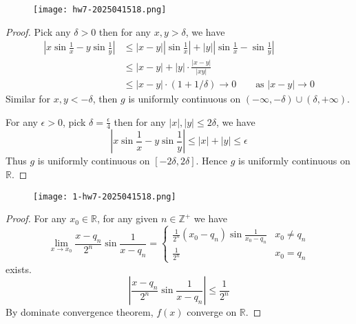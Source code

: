 \begin{exercise}
\begin{figure}[H]
\centering
\texttt{[image: hw7-2025041518.png]}
\label{}
\end{figure}
\end{exercise}
\begin{proof}
Pick any $\delta>0$ then for any $x,y>\delta$, we have
\[
\begin{aligned}
\left\lvert  x\sin\frac{1}{x}-y\sin\frac{1}{y}  \right\rvert  & \leq \lvert x-y \rvert \left\lvert  \sin\frac{1}{x}  \right\rvert +\lvert y \rvert \left\lvert  \sin\frac{1}{x}-\sin\frac{1}{y}  \right\rvert  \\
 & \leq \lvert x-y \rvert +\lvert y \rvert \cdot\frac{\lvert x-y \rvert }{\lvert xy \rvert } \\
 & \leq \lvert x-y \rvert \cdot (1+1/\delta) \to0\qquad \text{as }\lvert x-y \rvert \to0
\end{aligned}
\]
Similar for $x,y<-\delta$, then $g$ is uniformly continuous on $(-\infty,-\delta)\cup(\delta,+\infty)$.

For any $\epsilon>0$, pick $\delta=\frac{\epsilon}{4}$ then for any $\lvert x \rvert,\lvert y \rvert\leq2\delta$, we have
\[
\left\lvert  x\sin\frac{1}{x}-y\sin\frac{1}{y}  \right\rvert \leq \lvert x \rvert +\lvert y \rvert \leq \epsilon
\]
Thus $g$ is uniformly continuous on $[-2\delta,2\delta]$. Hence $g$ is uniformly continuous on $\mathbb{R}$.
\end{proof}

\begin{exercise}
\begin{figure}[H]
\centering
\texttt{[image: 1-hw7-2025041518.png]}
\label{}
\end{figure}
\end{exercise}
\begin{proof}
For any $x_0\in \mathbb{R}$, for any given $n\in \mathbb{Z}^{+}$ we have
\[
\lim_{ x \to x_0 } \frac{x-q_n}{2^{n}}\sin\frac{1}{x-q_n}=\begin{cases}
\frac{1}{2^{n}}(x_0-q_n)\sin\frac{1}{x_0-q_n} & x_0\neq q_n \\
\frac{1}{2^{n}} & x_0=q_n
\end{cases}
\]
exists.
\[
\left\lvert  \frac{x-q_n}{2^{n}}\sin\frac{1}{x-q_n}  \right\rvert \leq \frac{1}{2^{n}}
\]
By dominate convergence theorem, $f(x)$ converge on $\mathbb{R}$.
\end{proof}
